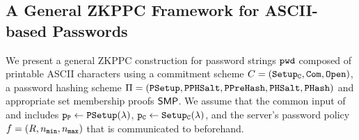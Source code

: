 
\subsection{A General ZKPPC Framework for ASCII-based Passwords} \label{sec:genconstruction}
We present a general \ac{ZKPPC} construction for password strings $\mathtt{pwd}$ composed of printable \ac{ASCII} characters using a commitment scheme $C=(\mathtt{Setup_C},\mathtt{Com},\mathtt{Open})$, a password hashing scheme $\Pi=(\mathtt{PSetup},\mathtt{PPHSalt},\allowbreak\mathtt{PPreHash},\allowbreak\mathtt{PHSalt},\allowbreak\mathtt{PHash})$ and appropriate set membership proofs $\mathsf{SMP}$. We assume that the common input of \Client and \Server includes $\mathtt{p_P}\gets\mathtt{PSetup}(\lambda)$, $\mathtt{p_C}\gets\mathtt{Setup_C}(\lambda)$, and the server's password policy $f=(R, {n_\mathtt{min}}, {n_\mathtt{max}})$ that is communicated to \Client beforehand.

